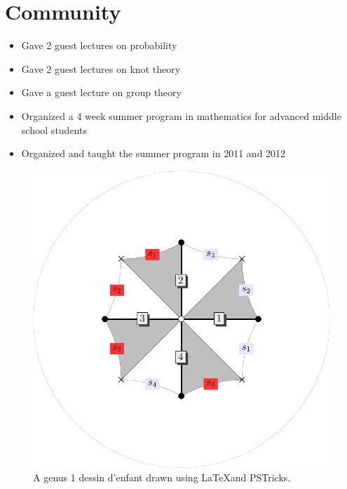 \documentclass[a4paper]{adcv}
\begin{document}
\section{Community}{
  \begin{adcvtabletwo}
      \vspace{-10pt}
      \begin{itemize}
        \item
          Gave 2 guest lectures on probability
        \item
          Gave 2 guest lectures on knot theory
      \end{itemize}
    \adcvrowskip
      \vspace{-10pt}
      \begin{itemize}
        \item
          Gave a guest lecture on group theory
      \end{itemize}
    \adcvrowskip
      \vspace{-10pt}
      \begin{itemize}
        \item
          Organized a 4 week summer program in mathematics for 
          advanced middle school students
        \item
          Organized and taught the summer program in 2011 and 2012
      \end{itemize}
  \end{adcvtabletwo}
}

\begin{figure}[ht]\label{fig:dessin}
  \centering
  \includegraphics[scale=0.2]{belyi1.pdf}
  \caption{
    A genus 1 dessin d'enfant drawn using \LaTeX and PSTricks.
  }
\end{figure}
\end{document}
